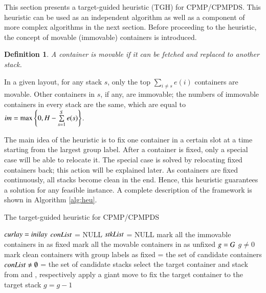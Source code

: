 \documentclass[review,3p,times,authoryear,12pt]{elsarticle}
\newtheorem{definition}{Definition}
\begin{document}
This section presents a target-guided heuristic (TGH) for CPMP/CPMPDS. This heuristic can be used as an independent algorithm as well as a component of more complex algorithms in the next section. Before proceeding to the heuristic, the concept of movable (immovable) containers is introduced.

\begin{definition}
\label{def:1}
A container is movable if it can be fetched and replaced to another stack.
\end{definition}

In a given layout, for any stack $s$, only the top $\sum\limits_{i\neq s}e(i)$ containers are movable. Other containers in $s$, if any, are immovable; the numbers of immovable containers in every stack are the same, which are equal to $\id{im}=\max\left\{0, H-\sum\limits_{s=1}^S e(s)\right\}$.

The main idea of the heuristic is to fix one container in a certain slot at a time starting from the largest group label. After a container is fixed, only a special case will be able to relocate it. The special case is solved by relocating fixed containers back; this action will be explained later.
As containers are fixed continuously, all stacks become clean in the end. Hence, this heuristic guarantees a solution for any feasible instance. A complete description of the framework is shown in Algorithm \ref{alg:heu}.

\begin{algorithm}[htbp]
	\caption{The target-guided heuristic for CPMP/CPMPDS}
	\label{alg:heu}
	\begin{codebox}
	\li $\id{curlay} = \id{inilay}$
    \li $\id{conList}$ = NULL
    \li $\id{stkList}$ = NULL
    \li mark all the immovable containers in  as fixed
    \li mark all the movable containers in  as unfixed
    \li $\id{g} = G$
    \li \While $g\neq0$
    \li \Do
            mark clean containers with group labels  as fixed\label{heu:c}
    \li     {} = the set of candidate containers
    \li     \While $\id{conList} \neq \emptyset$\label{heu:l}
    \li     \Do
                 = the set of candidate stacks
    \li         select the target container and stack from  and , respectively
    \li         apply a giant move to fix the target container to the target stack
            \End
    \li $g=g-1$
        \End
	\end{codebox}	
\end{algorithm}
\end{document}
